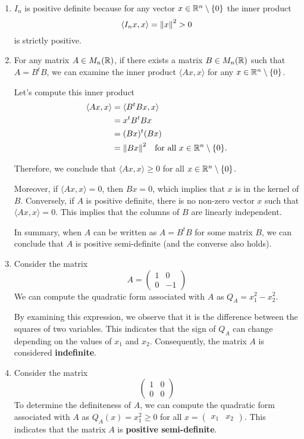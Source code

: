 \documentclass[../Analysis-3.tex]{subfiles}
\begin{document}
\begin{Eg}{}{}
  \begin{enumerate}
    \item  $I_n$ is positive definite because for any vector $x \in \mathbb{R}^n \setminus \{0\}$ the inner product \[ \left\langle I_nx, x \right\rangle = \norm{x}^2 > 0 \] is strictly positive.
    \item For any matrix $A \in M_n(\mathbb{R})$, if there exists a matrix $B \in M_n(\mathbb{R})$ such that $A = B^tB$, we can examine the inner product $\langle Ax, x \rangle$ for any $x \in \mathbb{R}^n \setminus \{0\}$.

          Let's compute this inner product
          \begin{align*}
            \langle Ax, x \rangle
             & = \langle B^tBx, x \rangle                                      \\
             & = x^tB^tBx                                                      \\
             & = (Bx)^t(Bx)                                                    \\
             & = \norm{Bx}^2 \quad \text{for all } x \in \mathbb{R}^n \setminus \{0\}.
          \end{align*}

          Therefore, we conclude that $\langle Ax, x \rangle \geq 0$ for all $x \in \mathbb{R}^n \setminus \{0\}$.

          Moreover, if $\langle Ax, x \rangle = 0$, then $Bx = 0$, which implies that $x$ is in the kernel of $B$. Conversely, if $A$ is positive definite, there is no non-zero vector $x$ such that $\langle Ax, x \rangle = 0$. This implies that the columns of $B$ are linearly independent.

          In summary, when $A$ can be written as $A = B^tB$ for some matrix $B$, we can conclude that $A$ is positive semi-definite (and the converse also holds).

    \item Consider the matrix \[ A = \begin{pmatrix}
              1 & 0  \\
              0 & -1
            \end{pmatrix} \]
          We can compute the quadratic form associated with $A$ as $Q_A = x_1^2 - x_2^2$.

          By examining this expression, we observe that it is the difference between the squares of two variables. This indicates that the sign of $Q_A$ can change depending on the values of $x_1$ and $x_2$. Consequently, the matrix $A$ is considered \textbf{indefinite}.
    \item Consider the matrix \[ \begin{pmatrix}
              1 & 0 \\
              0 & 0
            \end{pmatrix} \]
          To determine the definiteness of $A$, we can compute the quadratic form associated with $A$ as $Q_A(x) = x_1^2 \geq 0$ for all $x = \begin{pmatrix} x_1 & x_2 \end{pmatrix}$. This indicates that the matrix $A$ is \textbf{positive semi-definite}.


\end{enumerate}
\end{Eg}
\end{document}
